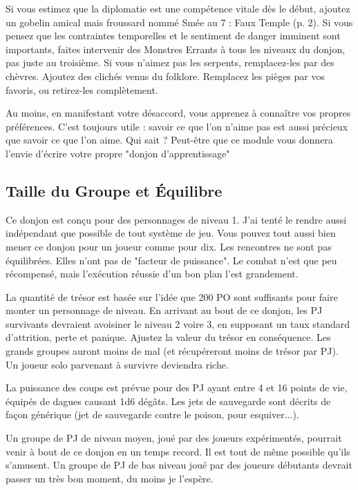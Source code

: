 Si vous estimez que la diplomatie est une compétence vitale dès le début, ajoutez un gobelin amical mais froussard nommé
Smée au 7 : Faux Temple (p. 2). 
Si vous pensez que les contraintes temporelles et le sentiment de danger imminent sont importants, faites intervenir des Monstres Errants à tous les niveaux du donjon, pas juste au troisième. 
Si vous n'aimez pas les serpents, remplacez-les par des chèvres. 
Ajoutez des clichés venus du folklore. 
Remplacez les pièges par vos favoris, ou retirez-les complètement.

Au moins, en manifestant votre désaccord, vous apprenez à connaître vos propres préférences. 
C'est toujours utile : savoir ce que l'on n'aime pas est aussi précieux que savoir ce que l'on
aime. 
Qui sait ? Peut-être que ce module vous donnera l'envie d'écrire votre propre "donjon d'apprentissage"

\subsection{Taille du Groupe et Équilibre}
Ce donjon est conçu pour des personnages de niveau 1. 
J'ai tenté le rendre aussi indépendant que possible de tout système de jeu. 
Vous pouvez tout aussi bien mener ce donjon pour un joueur comme pour dix. 
Les rencontres ne sont pas équilibrées. 
Elles n'ont pas de "facteur de puissance". 
Le combat n'est que peu récompensé, mais l'exécution réussie d'un bon plan l'est grandement.

La quantité de trésor est basée sur l'idée que 200 PO sont suffisants pour faire monter un personnage de niveau. 
En arrivant au bout de ce donjon, les PJ survivants devraient avoisiner le niveau 2 voire 3, en supposant un taux standard d'attrition, perte et panique. 
Ajustez la valeur du trésor en conséquence. 
Les grands groupes auront moins de mal (et récupéreront moins de trésor par PJ).
Un joueur solo parvenant à survivre deviendra riche.

La puissance des coups est prévue pour des PJ ayant entre 4 et 16 points de vie, équipés de dagues causant 1d6 dégâts.
Les jets de sauvegarde sont décrits de façon générique (jet de sauvegarde contre le poison, pour esquiver...).

Un groupe de PJ de niveau moyen, joué par des joueurs expérimentés, pourrait venir à bout de ce donjon en un temps
record. 
Il est tout de même possible qu'ils s'amusent. 
Un groupe de PJ de bas niveau joué par des joueurs débutants devrait passer un très bon moment, du moins je l'espère.

